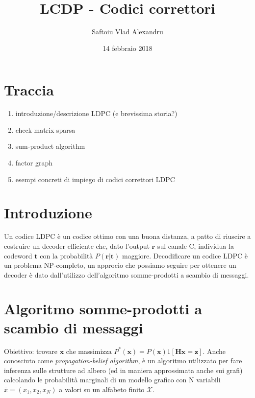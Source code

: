 \documentclass{article}
\title{LCDP - Codici correttori}
\date{14 febbraio 2018}
\author{Saftoiu Vlad Alexandru}
\begin{document}
	\maketitle
	\newpage

	\tableofcontents
	\newpage

	\section{Traccia}
	\begin{enumerate}
		\item introduzione/descrizione LDPC (e brevissima storia?)
		\item check matrix sparsa 
		\item sum-product algorithm
		\item factor graph
		\item esempi concreti di impiego di codici correttori LDPC
	\end{enumerate}

	\section{Introduzione}
	Un codice LDPC è un codice ottimo con una buona distanza, a patto di riuscire a costruire un decoder efficiente che, dato l'output $\textbf{r}$ sul canale C, individua la codeword $\textbf{t}$ con la probabilità $P(\textbf{r}|\textbf{t})$ maggiore. Decodificare un codice LDPC è un problema NP-completo, un approcio che possiamo seguire per ottenere un decoder è dato dall'utilizzo dell'algoritmo somme-prodotti a scambio di messaggi.
	
	\section{Algoritmo somme-prodotti a scambio di messaggi}
Obiettivo: trovare $\textbf{x}$ che massimizza $P^*(\textbf{x})=P(\textbf{x})1[\textbf{Hx} = \textbf{z}]$.
Anche conosciuto come \textit{propagation-belief algorithm}, è un algoritmo utilizzato per fare inferenza sulle strutture ad albero (ed in maniera approssimata anche sui grafi) calcolando le probabilità marginali di un modello grafico con N variabili $\bar{x} = (x_1,x_2, x_N)$ a valori su un alfabeto finito $\mathcal{X}$.
\end{document}
